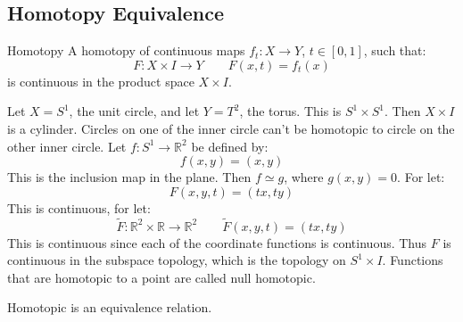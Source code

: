 \documentclass[crop=false,class=book,oneside]{standalone}
\begin{document}
        \subsection{Homotopy Equivalence}
            \begin{ldefinition}{Homotopy}
                A homotopy of continuous maps
                $f_{t}:X\rightarrow{Y}$, $t\in[0,1]$, such that:
                \begin{equation}
                    F:X\times{I}\rightarrow{Y}
                    \quad\quad
                    F(x,t)=f_{t}(x)
                \end{equation}
                is continuous in the product space $X\times{I}$.
            \end{ldefinition}
            \begin{lexample}
                Let $X=S^{1}$, the unit circle, and let
                $Y=T^{2}$, the torus. This is
                $S^{1}\times{S}^{1}$. Then $X\times{I}$ is
                a cylinder. Circles on one of the inner circle
                can't be homotopic to circle on the other
                inner circle. Let
                $f:S^{1}\rightarrow\mathbb{R}^{2}$ be defined by:
                \begin{equation}
                    f(x,y)=(x,y)
                \end{equation}
                This is the inclusion map in the plane. Then
                $f\simeq{g}$, where $g(x,y)=0$. For let:
                \begin{equation}
                    F(x,y,t)=(tx,ty)
                \end{equation}
                This is continuous, for let:
                \begin{equation}
                    \tilde{F}:\mathbb{R}^{2}\times\mathbb{R}
                    \rightarrow\mathbb{R}^{2}\quad\quad
                    \tilde{F}(x,y,t)=(tx,ty)
                \end{equation}
                This is continuous since each of the
                coordinate functions is continuous. Thus
                $F$ is continuous in the subspace topology, which
                is the topology on $S^{1}\times{I}$. Functions
                that are homotopic to a point are called null
                homotopic.
            \end{lexample}
            \begin{theorem}
                Homotopic is an equivalence relation.
            \end{theorem}
\end{document}

